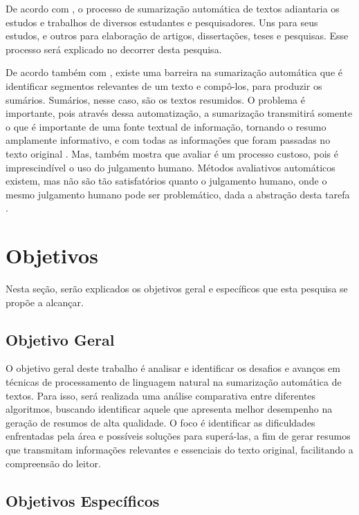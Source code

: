 De acordo com , o processo de sumarização automática de textos adiantaria os estudos e trabalhos de diversos estudantes e pesquisadores. Uns para seus 
estudos, e outros para elaboração de artigos, dissertações, teses e pesquisas. 
Esse processo será explicado no decorrer desta pesquisa.

De acordo também com , existe uma barreira
na sumarização automática que é identificar segmentos relevantes de um texto e 
compô-los, para produzir os sumários. Sumários, nesse caso, são os textos 
resumidos. O problema é importante, pois através dessa automatização, a 
sumarização transmitirá somente o que é importante de uma fonte textual de 
informação, tornando o resumo amplamente informativo, e com todas as 
informações que foram passadas no texto original 
\cite{black1988practical,torres2014automatic,barzilay1997michael}. Mas, também 
mostra que avaliar é um processo custoso, pois é imprescindível o uso do 
julgamento humano. Métodos avaliativos automáticos existem, mas não são tão 
satisfatórios quanto o julgamento humano, onde o mesmo julgamento humano pode 
ser problemático, dada a abstração desta tarefa \cite{eco2023definicao}.

\section{Objetivos}
\label{sec:objetivo}
Nesta seção, serão explicados os objetivos geral e específicos que esta pesquisa se propõe a alcançar.

\subsection{Objetivo Geral}
\label{sec:objgeral}
O objetivo geral deste trabalho é analisar e identificar os desafios e avanços em técnicas de 
processamento de linguagem natural na sumarização automática de textos. Para isso, será realizada uma análise comparativa entre diferentes algoritmos, buscando identificar aquele que apresenta melhor desempenho na geração de resumos de alta qualidade. O foco é identificar as dificuldades enfrentadas pela área e possíveis soluções para superá-las, a fim de gerar resumos que transmitam informações 
relevantes e essenciais do texto original, facilitando a compreensão do leitor.

\subsection{Objetivos Específicos}
\label{sec:objespecificos}

